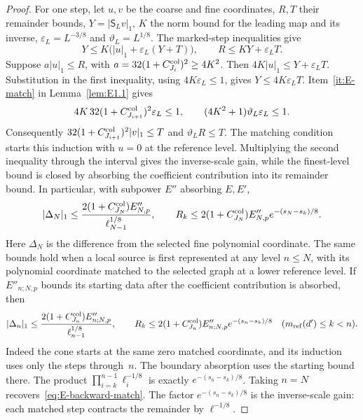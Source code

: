 \begin{proof}
For one step, let $u,v$ be the coarse and fine coordinates, $R,T$ their remainder bounds, $Y=|\mathsf S_Lv|_1$, $K$ the norm bound for the leading map and its inverse, $\varepsilon_L=L^{-3/8}$ and $\vartheta_L=L^{1/8}$. The marked-step inequalities give
\begin{equation}\label{eq:E-match-cone}
 Y\le K\bigl(|u|_1+\varepsilon_L(Y+T)\bigr),\qquad R\le KY+\varepsilon_L T.
\end{equation}
Suppose $a|u|_1\le R$, with $a=32(1+C^{\rm col}_{J_i})^2\ge4K^2$. Then $4K|u|_1\le Y+\varepsilon_L T$. Substitution in the first inequality, using $4K\varepsilon_L\le1$, gives $Y\le4K\varepsilon_L T$. Item~\ref{it:E-match} in Lemma~\ref{lem:E1.1} gives
\begin{equation*}
 4K\,32(1+C^{\rm col}_{J_{i+1}})^2\varepsilon_L\le1,\qquad
 (4K^2+1)\vartheta_L\varepsilon_L\le1.
\end{equation*}
Consequently $32(1+C^{\rm col}_{J_{i+1}})^2|v|_1\le T$ and $\vartheta_L R\le T$. The matching condition starts this induction with $u=0$ at the reference level. Multiplying the second inequality through the interval gives the inverse-scale gain, while the finest-level bound is closed by absorbing the coefficient contribution into its remainder bound. In particular, with subpower $E''$ absorbing $E,E'$,
\begin{equation}\label{eq:E-backward-match}
 |\Delta_N|_1\le\frac{2(1+C^{\rm col}_{J_N})E''_{N,p}}{\ell_{N-1}^{1/8}},\qquad
 R_k\le2(1+C^{\rm col}_{J_N})E''_{N,p}e^{-(s_N-s_k)/8}.
\end{equation}
Here $\Delta_N$ is the difference from the selected fine polynomial coordinate. The same bounds hold when a local source is first represented at any level $n\le N$, with its polynomial coordinate matched to the selected graph at a lower reference level. If $E''_{n;N,p}$ bounds its starting data after the coefficient contribution is absorbed, then
\begin{equation}\label{eq:E-backward-match-level}
 |\Delta_n|_1\le\frac{2(1+C^{\rm col}_{J_n})E''_{n;N,p}}{\ell_{n-1}^{1/8}},\qquad
 R_k\le2(1+C^{\rm col}_{J_n})E''_{n;N,p}e^{-(s_n-s_k)/8}
 \quad(m_{\mathrm{ref}}(d')\le k<n).
\end{equation}
Indeed the cone starts at the same zero matched coordinate, and its induction uses only the steps through~$n$. The boundary absorption uses the starting bound there. The product $\prod_{i=k}^{n-1}\ell_i^{-1/8}$ is exactly $e^{-(s_n-s_k)/8}$. Taking $n=N$ recovers~\eqref{eq:E-backward-match}. The factor $e^{-(s_n-s_k)/8}$ is the inverse-scale gain: each matched step contracts the remainder by $\ell^{-1/8}$.


\end{proof}
